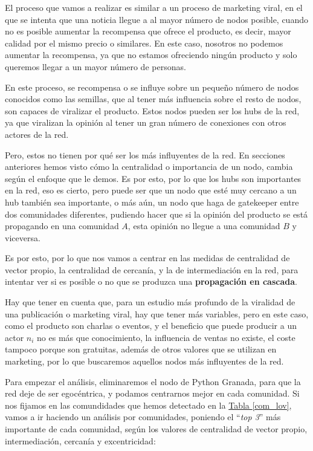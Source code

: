 \documentclass[paper=a4, fontsize=11pt]{article} %
\numberwithin{equation}{section} %
\numberwithin{figure}{section} %
\numberwithin{table}{section} %
\begin{document}
El proceso que vamos a realizar es similar a un proceso de marketing viral, en el que se intenta que una noticia llegue a al mayor número de nodos posible, cuando no es posible aumentar la recompensa que ofrece el producto, es decir, mayor calidad por el mismo precio o similares. En este caso, nosotros no podemos aumentar la recompensa, ya que no estamos ofreciendo ningún producto y solo queremos llegar a un mayor número de personas.

En este proceso, se recompensa o se influye sobre un pequeño número de nodos conocidos como las semillas, que al tener más influencia sobre el resto de nodos, son capaces de viralizar el producto. Estos nodos pueden ser los hubs de la red, ya que viralizan la opinión al tener un gran número de conexiones con otros actores de la red.

Pero, estos no tienen por qué ser los más influyentes de la red. En secciones anteriores hemos visto cómo la centralidad o importancia de un nodo, cambia según el enfoque que le demos. Es por esto, por lo que los hubs son importantes en la red, eso es cierto, pero puede ser que un nodo que esté muy cercano a un hub también sea importante, o más aún, un nodo que haga de gatekeeper entre dos comunidades diferentes, pudiendo hacer que si la opinión del producto se está propagando en una comunidad $A$, esta opinión no llegue a una comunidad $B$ y viceversa.

Es por esto, por lo que nos vamos a centrar en las medidas de centralidad de vector propio, la centralidad de cercanía, y la de intermediación en la red, para intentar ver si es posible o no que se produzca una \textbf{propagación en cascada}.

 Hay que tener en cuenta que, para un estudio más profundo de la viralidad de una publicación o marketing viral, hay que tener más variables, pero en este caso, como el producto son charlas o eventos, y el beneficio que puede producir a un actor $n_i$ no es más que conocimiento, la influencia de ventas no existe, el coste tampoco porque son gratuitas, además de otros valores que se utilizan en marketing, por lo que buscaremos aquellos nodos más influyentes de la red.

Para empezar el análisis, eliminaremos el nodo de Python Granada, para que la red deje de ser egocéntrica, y podamos centrarnos mejor en cada comunidad. Si nos fijamos en las comundidades que hemos detectado en la \hyperref[com_lov]{Tabla \ref*{com_lov}}, vamos a ir haciendo un análisis por comunidades, poniendo el ``\textit{top 3}'' más importante de cada comunidad, según los valores de centralidad de vector propio, intermediación, cercanía y excentricidad:
\end{document}
